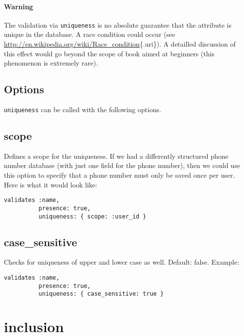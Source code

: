 \documentclass[a4paper]{book}
\newcounter{tab}[chapter]
\begin{document}
\paragraph{Warning}\label{warning-7}

The validation via \texttt{uniqueness} is no absolute guarantee that the attribute is unique in the database. A race condition could occur (see \url{http://en.wikipedia.org/wiki/Race_condition}\{.uri\}). A detailled discussion of this effect would go beyond the scope of book aimed at beginners (this phenomenon is extremely rare).

\subsection{Options}\label{options-5}

\texttt{uniqueness} can be called with the following options.

\subsection{scope}\label{scope}

Defines a scope for the uniqueness. If we had a differently structured phone number database (with just one field for the phone number), then we could use this option to specify that a phone number must only be saved once per user. Here is what it would look like:

\begin{shaded}\begin{verbatim}
validates :name,
          presence: true,
          uniqueness: { scope: :user_id }
\end{verbatim}\end{shaded}

\subsection{case\_sensitive}\label{caseux5fsensitive}

Checks for uniqueness of upper and lower case as well. Default: false. Example:

\begin{shaded}\begin{verbatim}
validates :name,
          presence: true,
          uniqueness: { case_sensitive: true }
\end{verbatim}\end{shaded}

\section{inclusion}\label{inclusion}
\end{document}
